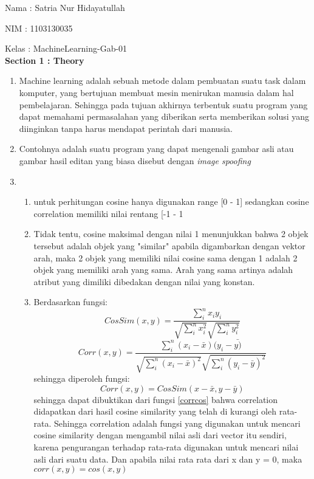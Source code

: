 \documentclass{article}
\begin{document}
Nama : Satria Nur Hidayatullah

NIM : 1103130035

Kelas : MachineLearning-Gab-01\\



\textbf{Section 1 : Theory}
\begin{enumerate}
	\item Machine learning adalah sebuah metode dalam pembuatan suatu task dalam komputer, yang bertujuan membuat
	mesin menirukan manusia dalam hal pembelajaran. Sehingga pada tujuan akhirnya terbentuk suatu program yang dapat
	memahami permasalahan yang diberikan serta memberikan solusi yang diinginkan tanpa harus mendapat perintah dari manusia.
	\item Contohnya adalah suatu program yang dapat mengenali gambar asli atau gambar hasil editan yang biasa disebut dengan \textit{image spoofing}
	\item
	\begin{enumerate}
		\item untuk perhitungan cosine hanya digunakan range [0 - 1] sedangkan cosine correlation memiliki nilai rentang [-1 - 1\
		\item Tidak tentu, cosine maksimal dengan nilai 1 menunjukkan bahwa 2 objek tersebut adalah objek yang "similar" apabila digambarkan dengan
		vektor arah, maka 2 objek yang memiliki nilai cosine sama dengan 1 adalah 2 objek yang memiliki arah yang sama. Arah yang sama artinya adalah atribut yang dimiliki dibedakan dengan nilai yang konstan.
		\item Berdasarkan fungsi:\\
		\begin{equation}\label{cossim}
			CosSim(x,y) = \dfrac{\sum_{i}^{n}x_{i}y_{i}}{\sqrt{\sum_{i}^{n}x_{i}^{2}}\sqrt{\sum_{i}^{n}y_{i}^{2}}}
		\end{equation}
		\begin{equation}\label{corr}
			Corr(x,y) = \dfrac{\sum_{i}^{n}(x_{i} - \bar{x})(y_{i} - \bar{y)}}{\sqrt{\sum_{i}^{n}(x_{i} - \bar{x})^{2}}\sqrt{\sum_{i}^{n}(y_{i} - \bar{y})^{2}}}
		\end{equation}
		sehingga diperoleh fungsi:\\
		\begin{equation}\label{corrcos}
			Corr(x,y) = CosSim(x - \bar{x}, y - \bar{y})
		\end{equation}
		sehingga dapat dibuktikan dari fungsi \eqref{corrcos} bahwa correlation didapatkan dari hasil cosine similarity yang telah di kurangi oleh rata-rata. Sehingga correlation adalah fungsi yang digunakan untuk mencari cosine similarity dengan mengambil nilai asli dari vector itu sendiri, karena pengurangan terhadap rata-rata digunakan untuk mencari nilai asli dari suatu data. Dan apabila nilai rata rata dari x dan y = 0, maka $ corr(x,y) = cos(x,y) $

\end{enumerate}
\end{enumerate}
\end{document}
